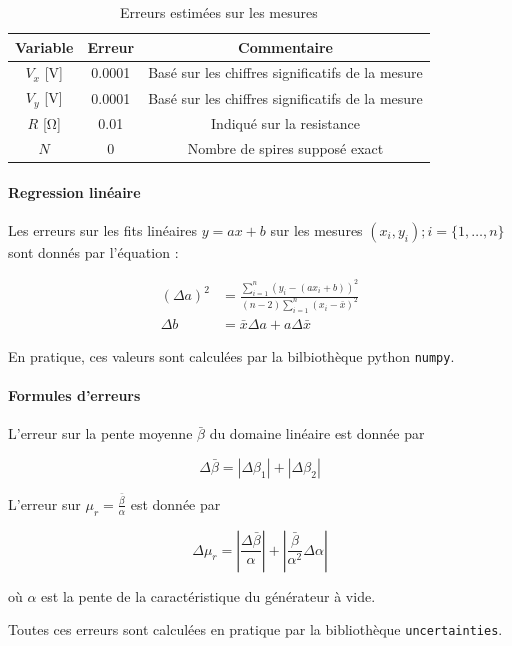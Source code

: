 \begin{table}[h]
    \centering
    \begin{tabulary}{\textwidth}{C C C}
        \toprule
        Variable & Erreur & Commentaire \\
        \midrule
        \(V_x\) [\si{\volt}] & 0.0001 & Basé sur les chiffres significatifs de la mesure \\
        \(V_y\) [\si{\volt}] & 0.0001 & Basé sur les chiffres significatifs de la mesure \\
        \(R\) [\si{\ohm}] & 0.01 & Indiqué sur la resistance \\
        \(N\) & 0 & Nombre de spires supposé exact \\
        \bottomrule
    \end{tabulary}
    \caption{Erreurs estimées sur les mesures}
    \label{tab:erreurs}
\end{table}

\paragraph*{Regression linéaire}
Les erreurs sur les fits linéaires \(y = ax + b\) sur les mesures \((x_i, y_i) ; i = \{1, \hdots, n\}\) sont donnés par l'équation \cite{erreursmesure}:

\begin{equation}
    \label{eq:erreur:fit}
    \begin{aligned}
        (\Delta a)^2 &= \frac{\sum_{i=1}^{n}(y_i - (a x_i + b))^2}{(n-2) \sum_{i=1}^{n}(x_i - \bar{x})^2}\\
        \Delta b &= \bar{x} \Delta a + a \Delta \bar{x}
    \end{aligned}
\end{equation}

En pratique, ces valeurs sont calculées par la bilbiothèque python \texttt{numpy}.

\paragraph*{Formules d'erreurs}
L'erreur sur la pente moyenne \(\bar{\beta}\) du domaine linéaire est donnée par

\begin{equation}
    \Delta \bar{\beta} = \left|\Delta \beta_1\right| + \left|\Delta \beta_2\right|
\end{equation}

L'erreur sur \(\mu_r = \frac{\bar{\beta}}{\alpha}\) est donnée par

\begin{equation}
    \Delta\mu_r = \left|\frac{\Delta\bar{\beta}}{\alpha}\right| + \left|\frac{\bar{\beta}}{\alpha^2} \Delta\alpha\right|
\end{equation}

où \(\alpha\) est la pente de la caractéristique du générateur à vide.

Toutes ces erreurs sont calculées en pratique par la bibliothèque \texttt{uncertainties}.
